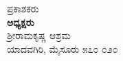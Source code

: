 \thispagestyle{empty}

\begin{center}
ಪ್ರಕಾಶಕರು\\\textbf{ಅಧ್ಯಕ್ಷರು}\\ಶ್ರೀರಾಮಕೃಷ್ಣ ಆಶ್ರಮ\\ಯಾದವಗಿರಿ, ಮೈಸೂರು ೫೭೦ ೦೨೦
\end{center}


